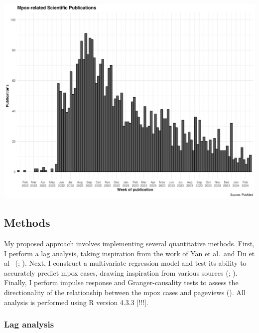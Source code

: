 \documentclass[
  12pt,
]{article}
\begin{document}
\begin{center}
\includegraphics{images/mpox-studies.png}
\end{center}

\subsection{Methods}\label{methods-1}

My proposed approach involves implementing several quantitative methods.
First, I perform a lag analysis, taking inspiration from the work of Yan
et al.~and Du et al~ (;
). Next, I construct a multivariate
regression model and test its ability to accurately predict mpox cases,
drawing inspiration from various sources (; ).
Finally, I perform impulse response and Granger-causality tests to
assess the directionality of the relationship between the mpox cases and
pageviews (). All analysis is
performed using R version 4.3.3 {[}!!!{]}.

\subsubsection{Lag analysis}\label{lag-analysis}
\end{document}
